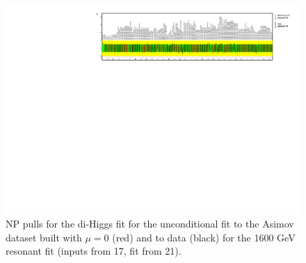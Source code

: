 \begin{figure}
\centering
\includegraphics[angle=270]{figures/results/HH/HadHad/HadHadFit21062021/PullsAndRankings/NP_allExceptGammas_2HDM1600.pdf}
\caption{NP pulls for the di-Higgs \hadhad fit for the unconditional fit to the Asimov dataset built with $\mu=0$ (red) and to data (black) for the 1600 GeV resonant fit (inputs from 17, fit from 21).}
\label{fig:HadHadPostfitNPPulls2HDM1600}
\end{figure}

